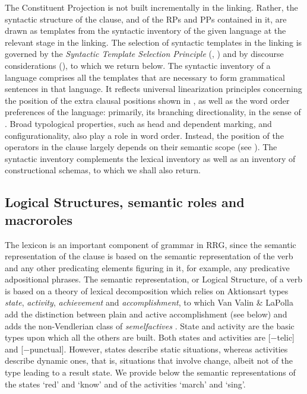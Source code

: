 \documentclass[output=paper,hidelinks]{langscibook}
\begin{document}
The Constituent Projection is not built incrementally in the linking. Rather, the syntactic structure of the clause, and of the RPs and PPs contained in it, are drawn as templates from the syntactic inventory of the given language at the relevant stage in the linking. The selection of syntactic templates in the linking is governed by the \textit{Syntactic Template Selection Principle} (\citealt[324]{VanValin1997}, \citealt[130]{VanValin2005}) and by discourse considerations (), to which we return below. The syntactic inventory of a language comprises all the templates that are necessary to form grammatical sentences in that language. It reflects universal linearization principles concerning the position of the extra clausal positions shown in , as well as the word order preferences of the language: primarily, its branching directionality, in the sense of \citet{Dryer1992}. Broad typological properties, such as head and dependent marking, and configurationality, also play a role in word order. Instead, the position of the operators in the clause largely depends on their semantic scope (see ). The syntactic inventory complements the lexical inventory as well as an inventory of constructional schemas, to which we shall also return.

  \subsection{Logical Structures, semantic roles and macroroles}
  \label{sec:RRG:2.2}

The lexicon is an important component of grammar in RRG, since the semantic representation of the clause is based on the semantic representation of the verb and any other predicating elements figuring in it, for example, any predicative adpositional phrases. The semantic representation, or Logical Structure, of a verb is based on a theory of lexical decomposition which relies on  Aktionsart types \textit{state}, \textit{activity}, \textit{achievement} and \textit{accomplishment}, to which Van Valin \& LaPolla add the distinction between plain and active accomplishment (see below) and \citet[32]{VanValin2005} adds the non-Vendlerian class of \textit{semelfactives} \citep[55-58]{Smith1997}. State and activity are the basic types upon which all the others are built. Both states and activities are [$-$telic] and [$-$punctual]. However, states describe static situations, whereas activities describe dynamic ones, that is, situations that involve change, albeit not of the type leading to a result state. We provide below the semantic representations of the states `red' and `know' and of the activities `march' and `sing'.
\end{document}
